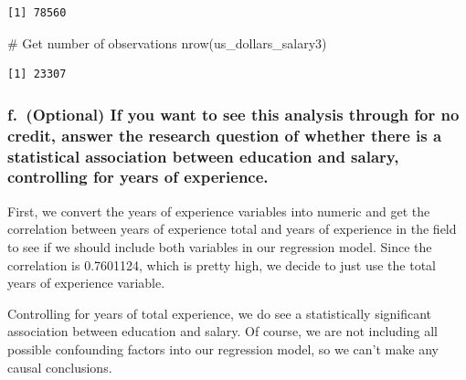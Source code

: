 \documentclass[
  letterpaper,
  DIV=11,
  numbers=noendperiod]{scrartcl}
\newenvironment{Shaded}{\begin{snugshade}}{\end{snugshade}}
\newcommand{\AttributeTok}[1]{\textcolor[rgb]{0.40,0.45,0.13}{#1}}
\newcommand{\CommentTok}[1]{\textcolor[rgb]{0.37,0.37,0.37}{#1}}
\newcommand{\FunctionTok}[1]{\textcolor[rgb]{0.28,0.35,0.67}{#1}}
\newcommand{\NormalTok}[1]{\textcolor[rgb]{0.00,0.23,0.31}{#1}}
\newcommand{\OtherTok}[1]{\textcolor[rgb]{0.00,0.23,0.31}{#1}}
\newcommand{\SpecialCharTok}[1]{\textcolor[rgb]{0.37,0.37,0.37}{#1}}
\newcommand{\StringTok}[1]{\textcolor[rgb]{0.13,0.47,0.30}{#1}}
\begin{document}
\begin{verbatim}
[1] 78560
\end{verbatim}

\begin{Shaded}
\begin{Highlighting}[]
\CommentTok{\# Get number of observations}
\FunctionTok{nrow}\NormalTok{(us\_dollars\_salary3)}
\end{Highlighting}
\end{Shaded}

\begin{verbatim}
[1] 23307
\end{verbatim}

\subsubsection{f.~(Optional) If you want to see this analysis through
for no credit, answer the research question of whether there is a
statistical association between education and salary, controlling for
years of
experience.}\label{f.-optional-if-you-want-to-see-this-analysis-through-for-no-credit-answer-the-research-question-of-whether-there-is-a-statistical-association-between-education-and-salary-controlling-for-years-of-experience.}

First, we convert the years of experience variables into numeric and get
the correlation between years of experience total and years of
experience in the field to see if we should include both variables in
our regression model. Since the correlation is 0.7601124, which is
pretty high, we decide to just use the total years of experience
variable.

Controlling for years of total experience, we do see a statistically
significant association between education and salary. Of course, we are
not including all possible confounding factors into our regression
model, so we can't make any causal conclusions.

\begin{Shaded}
\end{Shaded}
\end{document}
